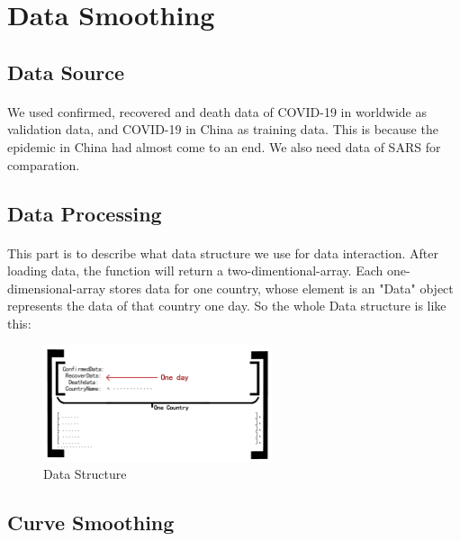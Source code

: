 \documentclass[]{article}
\begin{document}
\section{Data Smoothing}
\subsection{Data Source}
\paragraph{}
We used
confirmed, recovered and death data of COVID-19 in worldwide as validation data\cite{bingdata}, and COVID-19 in China as training data. This is because the epidemic in China had almost come to an end. We also need data of SARS\cite{whodata} for comparation.
\subsection{Data Processing}
\paragraph{}
This part is to describe what data structure we use for data interaction.
After loading data, the function will return a two-dimentional-array.
Each one-dimensional-array stores data for one country, whose element 
is an "Data" object represents the data of that country one day. 
So the whole Data structure is like this:
\begin{figure}[H]
    \centering
    \includegraphics[width = 0.6\textwidth]{Data_Structure.png}
    \caption{Data Structure}
\end{figure}
\subsection{Curve Smoothing}
\end{document}

